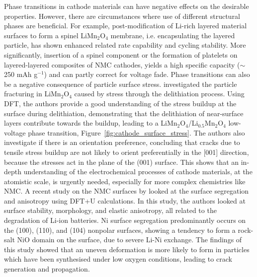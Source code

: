 \documentclass[../main.tex]{subfiles}
\begin{document}
Phase transitions in cathode materials can have negative effects on the desirable properties. However, there are circumstances where use of different structural phases are beneficial. For example, post-modification of Li-rich layered material surfaces to form a spinel LiMn$_2$O$_4$ membrane, i.e. encapsulating the layered particle, has shown enhanced related rate capability and cycling stability.\cite{Ledwaba2020,deng2017layered,deng2016layered} More significantly, insertion of a spinel component\cite{long2014advances} or the formation of platelets\cite{wang2013nanoarchitecture} on layered-layered composites of NMC cathodes, yields a high specific capacity ($\sim$250 mAh g$^{-1}$) and can partly correct for voltage fade.\cite{Ledwaba2020} Phase transitions can also be a negative consequence of particle surface stress. \citeauthor{warburton2020oriented} investigated the particle fracturing in LiMn$_2$O$_4$ caused by stress through the delithiation process.\cite{warburton2020oriented} Using DFT, the authors provide a good understanding of the stress buildup at the surface during delithiation, demonstrating that the delithiation of near-surface layers contribute towards the buildup, leading to a LiMn$_2$O$_4$/Li$_{0.5}$Mn$_2$O$_4$ low-voltage phase transition, Figure~\ref{fig:cathode_surface_stress}. The authors also investigate if there is an orientation preference, concluding that cracks due to tensile stress buildup are not likely to orient preferentially in the [001] direction, because the stresses act in the plane of the (001) surface.\cite{warburton2020oriented} This shows that an in-depth understanding of the electrochemical processes of cathode materials, at the atomistic scale, is urgently needed, especially for more complex chemistries like NMC. A recent study on the NMC surfaces by \citeauthor{liang2018ab} looked at the surface segregation and anisotropy using DFT+U calculations.\cite{liang2018ab} In this study, the authors looked at surface stability, morphology, and elastic anisotropy, all related to the degradation of Li-ion batteries. Ni surface segregation predominantly occurs on the (100), (110), and (104) nonpolar surfaces, showing a tendency to form a rock-salt NiO domain on the surface, due to severe Li-Ni exchange. The findings of this study showed that an uneven deformation is more likely to form in particles which have been synthesised under low oxygen conditions, leading to crack generation and propagation.\cite{liang2018ab}
\end{document}
